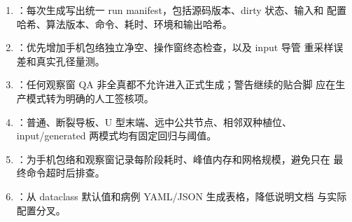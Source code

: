 \begin{enumerate}
  \item {}：每次生成写出统一 run manifest，包括源码版本、dirty 状态、输入和
  配置哈希、算法版本、命令、耗时、环境和输出哈希。
  \item {}：优先增加手机包络独立净空、操作窗终态检查，以及 input 导管
  重采样误差和真实孔径量测。
  \item {}：任何观察窗 QA 非全真都不允许进入正式生成；警告继续的贴合脚
  应在生产模式转为明确的人工签核项。
  \item {}：普通、断裂导板、U 型末端、远中公共节点、相邻双种植位、
  input/generated 两模式均有固定回归与阈值。
  \item {}：为手机包络和观察窗记录每阶段耗时、峰值内存和网格规模，避免只在
  最终命令超时后排查。
  \item {}：从 dataclass 默认值和病例 YAML/JSON 生成表格，降低说明文档
  与实际配置分叉。
\end{enumerate}


